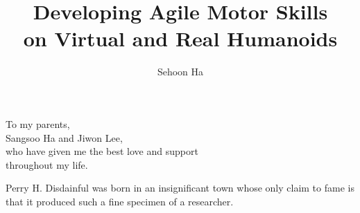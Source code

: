 \documentclass[12pt]{gatech-thesis}
\title{Developing Agile Motor Skills \protect\\
  on Virtual and Real Humanoids}
\author{Sehoon Ha}
\begin{document}

\begin{preliminary}
\begin{dedication}
\null\vfil
{\large
\begin{center}
To my parents, \\\vspace{12pt}
Sangsoo Ha and Jiwon Lee, \\\vspace{12pt}
who have given me the best love and support \\\vspace{12pt}
throughout my life.
\end{center}}
\vfil\null
\end{dedication}
\begin{acknowledgements}

\end{acknowledgements}
\contents
\begin{summary}

\end{summary}
\end{preliminary}













\begin{postliminary}
{}
\begin{vita}
Perry H. Disdainful was born in an insignificant town
whose only claim to fame is that it produced such a fine
specimen of a researcher.
\end{vita}
\end{postliminary}
\end{document}
